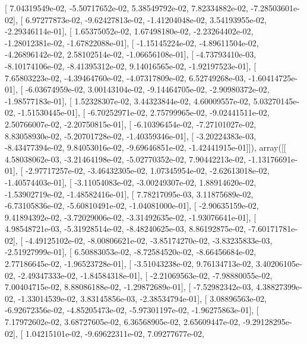 \documentclass{article}
\begin{document}
       [  7.04319549e-02,  -5.50717652e-02,   5.38549792e-02,
          7.82334882e-02,  -7.28503601e-02],
       [  6.97277873e-02,  -9.62427813e-02,  -1.41204048e-02,
          3.54193955e-02,  -2.29346114e-01],
       [  1.65375052e-02,   1.67498180e-02,  -2.23264402e-02,
         -1.28012381e-02,  -1.67822088e-01],
       [ -1.15145224e-02,  -4.89611504e-02,  -4.26896142e-02,
          2.58102514e-02,  -1.06656108e-01],
       [ -4.73793410e-03,  -8.10174106e-02,  -8.41395312e-02,
          9.14016565e-02,  -1.92197523e-01],
       [  7.65803223e-02,  -4.39464760e-02,  -4.07317809e-02,
          6.52749268e-03,  -1.60414725e-01],
       [ -6.03674959e-02,   3.00143104e-02,  -9.14464705e-02,
         -2.90980372e-02,  -1.98577183e-01],
       [  1.52328307e-02,   3.44323844e-02,   4.60009557e-02,
          5.03270145e-02,  -1.51530445e-01],
       [ -6.70252971e-02,   2.75799965e-02,  -9.02441511e-02,
          2.50766007e-02,  -2.20750815e-01],
       [ -6.10396454e-02,  -7.27101027e-02,   8.83058930e-02,
         -5.20701728e-02,  -1.40359346e-01],
       [ -3.20224383e-03,  -8.43477394e-02,   9.84053016e-02,
         -9.69646851e-02,  -1.42441915e-01]]), array([[  4.58038062e-03,  -3.21464198e-02,  -5.02770352e-02,
          7.90442213e-02,  -1.13176691e-01],
       [ -2.97717257e-02,  -3.46432305e-02,   1.07345954e-02,
         -2.62613018e-02,  -1.40574403e-01],
       [ -3.11054083e-02,  -3.00249307e-02,   1.88914620e-02,
         -1.53902719e-02,  -1.48582416e-01],
       [  7.78217095e-03,   3.11875689e-02,  -6.73105836e-02,
         -5.60810491e-02,  -1.04081000e-01],
       [ -2.90635159e-02,   9.41894392e-02,  -3.72029006e-02,
         -3.31492635e-02,  -1.93076641e-01],
       [  4.98548721e-03,  -5.31928514e-02,  -8.48240625e-03,
          8.86192875e-02,  -7.60171781e-02],
       [ -4.49125102e-02,  -8.00806621e-02,  -3.85174270e-02,
         -3.83235833e-03,  -2.51927999e-01],
       [  6.50883053e-02,  -8.72584520e-02,  -8.66456684e-02,
          2.77186645e-02,  -1.96523728e-01],
       [ -3.51043238e-02,   9.76134713e-02,   3.40206105e-02,
         -2.49347333e-02,  -1.84584318e-01],
       [ -2.21069563e-02,  -7.98880055e-02,   7.00404715e-02,
          8.88086188e-02,  -1.29872689e-01],
       [ -7.52982342e-03,   4.38827399e-02,  -1.33014539e-02,
          3.83145856e-03,  -2.38534794e-01],
       [  3.08896563e-02,  -6.92672356e-02,  -4.85205473e-02,
         -5.97301197e-02,  -1.96275863e-01],
       [  7.17972602e-02,   3.68727605e-02,   6.36568905e-02,
          2.65609447e-02,  -9.29128295e-02],
       [  1.04215101e-02,  -9.69622311e-02,   7.09277677e-02,
\end{document}
